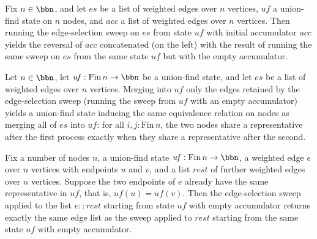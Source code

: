 \begin{lemma}
\label{Kruskal.processEdges_acc}
\leanok
{}
Fix $n \in \bbn$, and let $\mathit{es}$ be a list of weighted edges over $n$ vertices,
$\mathit{uf}$ a union-find state on $n$ nodes, and $\mathit{acc}$ a list of weighted
edges over $n$ vertices. Then running the edge-selection sweep on $\mathit{es}$ from
state $\mathit{uf}$ with initial accumulator $\mathit{acc}$ yields the reversal of
$\mathit{acc}$ concatenated (on the left) with the result of running the same sweep on
$\mathit{es}$ from the same state $\mathit{uf}$ but with the empty accumulator.
\end{lemma}

\begin{lemma}
\label{Kruskal.processEdges_same_partition}
\leanok
{}
Let $n \in \bbn$, let $\mathit{uf} : \mathrm{Fin}\,n \to \bbn$ be a union-find state,
and let $\mathit{es}$ be a list of weighted edges over $n$ vertices. Merging into
$\mathit{uf}$ only the edges retained by the edge-selection sweep (running the sweep
from $\mathit{uf}$ with an empty accumulator) yields a union-find state inducing the
same equivalence relation on nodes as merging all of $\mathit{es}$ into $\mathit{uf}$:
for all $i, j : \mathrm{Fin}\,n$, the two nodes share a representative after the first
process exactly when they share a representative after the second.
\end{lemma}

\begin{lemma}
\label{Kruskal.processEdges_skip}
\leanok
{}
Fix a number of nodes $n$, a union-find state $\mathit{uf} : \mathrm{Fin}\,n \to \bbn$,
a weighted edge $e$ over $n$ vertices with endpoints $u$ and $v$, and a list
$\mathit{rest}$ of further weighted edges over $n$ vertices. Suppose the two endpoints
of $e$ already have the same representative in $\mathit{uf}$, that is, $\mathit{uf}(u) =
\mathit{uf}(v)$. Then the edge-selection sweep applied to the list $e :: \mathit{rest}$
starting from state $\mathit{uf}$ with empty accumulator returns exactly the same edge
list as the sweep applied to $\mathit{rest}$ starting from the same state $\mathit{uf}$
with empty accumulator.
\end{lemma}

